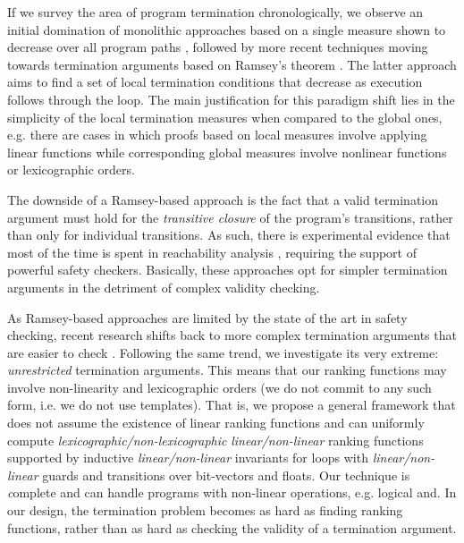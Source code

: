 \documentclass[preprint]{sigplanconf}
\theoremstyle{definition}
\begin{document}
If we survey the area of program termination chronologically, we observe an initial domination of  monolithic approaches based on a single measure shown to decrease
over all program paths %
\cite{DBLP:conf/vmcai/P04,DBLP:conf/cav/BradleyMS05}, followed by 
more recent techniques moving towards termination arguments based on Ramsey's theorem \cite{DBLP:conf/lpe/CodishG03,DBLP:conf/lics/PodelskiR04,DBLP:conf/pldi/CookPR06}.
The latter approach aims to find a set of local termination conditions that decrease as execution follows through the loop. %
The main justification for this paradigm shift lies in the simplicity of the local termination measures when compared to the global ones, e.g.
there are cases in which proofs based on local measures involve applying linear functions while corresponding global
measures involve nonlinear functions or lexicographic orders.


The downside of a Ramsey-based approach is the fact that a valid termination argument must hold for the \emph{transitive closure}
of the program's transitions, rather than only for individual transitions. 
As such, there is experimental evidence that most of the time is spent in reachability analysis \cite{DBLP:conf/pldi/CookPR06}, 
requiring the support of powerful safety checkers.
Basically, these approaches opt for simpler termination arguments in the detriment of complex validity checking.


As Ramsey-based approaches are limited by the state of the art in safety checking, 
recent research shifts back to more complex termination arguments that are easier to check \cite{DBLP:conf/tacas/CookSZ13,DBLP:conf/cav/KroeningSTW10}.
%
%
Following the same trend, %
we investigate its very extreme: \emph{unrestricted} termination arguments. 
This means that our ranking functions may involve non-linearity and lexicographic orders (we do not commit to any such form, i.e. we do not use templates).
That is, we propose a general framework that does not assume the existence of linear ranking functions and can uniformly compute
\emph{lexicographic/non-lexicographic} \emph{linear/non-linear} 
ranking functions supported by inductive \emph{linear/non-linear} invariants for loops with 
\emph{linear/non-linear} guards and transitions over bit-vectors and floats.
Our technique is {\emph complete} and can handle programs with non-linear operations, e.g. logical and.
In our design, the termination problem becomes as hard as finding ranking functions, rather than as hard as
checking the validity of a termination argument. 
\end{document}

